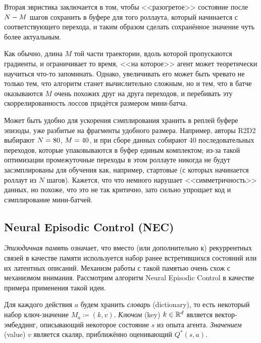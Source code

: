 Вторая эвристика заключается в том, чтобы <<разогретое>> состояние после $N \HM- M$ шагов сохранить в буфере для того роллаута, который начинается с соответствующего перехода, и таким образом сделать сохранённое значение чуть более актуальным.

Как обычно, длина $M$ той части траектории, вдоль которой пропускаются градиенты, и ограничивает то время, <<на которое>> агент может теоретически научиться что-то запоминать. Однако, увеличивать его может быть чревато не только тем, что алгоритм станет вычислительно сложным, но и тем, что в батче оказываются $M$ очень похожих друг на друга переходов, и перебивать эту скоррелированность лоссов придётся размером мини-батча.

\begin{remark}
Может быть удобно для ускорения сэмплирования хранить в реплей буфере эпизоды, уже разбитые на фрагменты удобного размера. Например, авторы R2D2 выбирают $N \HM= 80$, $M \HM= 40$, и при сборе данных собирают 40 последовательных переходов, которые упаковываются в буфер единым комплектом; из-за такой оптимизации промежуточные переходы в этом роллауте никогда не будут засэмплированы для обучения как, например, стартовые (с которых начинается роллаут из $N$ шагов). Кажется, что что немного нарушает <<симметричность>> данных, но похоже, что это не так критично, зато сильно упрощает код и сэмплирование мини-батчей.
\end{remark}

\subsection{Neural Episodic Control (NEC)}

\emph{Эпизодичная память} означает, что вместо (или дополнительно к) рекуррентных связей в качестве памяти используется набор ранее встретившихся состояний или их латентных описаний. Механизм работы с такой памятью очень схож с механизмом внимания. Рассмотрим алгоритм Neural Episodic Control в качестве примера применения такой идеи.

Для каждого действия $a$ будем хранить \emph{словарь} (dictionary), то есть некоторый набор ключ-значение $M_a \coloneqq (k, v)$. \emph{Ключом} (key) $k \in \mathbb{R}^d$ является вектор-эмбеддинг, описывающий некоторое состояние $s$ из опыта агента. \emph{Значением} (value) $v$ является скаляр, приближённо оценивающий $Q^*(s, a)$.

